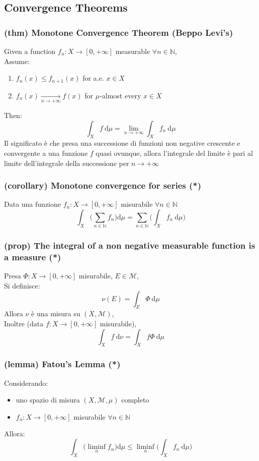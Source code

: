 \subsection{Convergence Theorems}
\subsubsection{(thm) Monotone Convergence Theorem (Beppo Levi's)}
Given a function $f_n:X\to [0,+\infty]$ measurable $\forall n\in \mathbb N$,\\
Assume:
\begin{enumerate}[label=\roman*.]
    \item $f_n(x)\le f_{n+1}(x)$ for a.e. $x\in X$
    \item $f_n(x)\xrightarrow[n\to+\infty]{} f(x)$ for $\mu$-almost every $x\in X$
\end{enumerate}
Then:
$$\int_X f\ \mathrm d\mu=\lim_{n\to +\infty}\int_X f_n\ \mathrm d\mu$$
Il significato è che presa una successione di funzioni non negative crescente e convergente a una funzione $f$ quasi ovunque, allora l'integrale del limite è pari al limite dell'integrale della successione per $n \to +\infty$

\subsubsection{(corollary) Monotone convergence for series (*)}
Data una funzione $f_n:X\to [0,+\infty]$ misurabile $\forall n\in \mathbb N$
$$\int_X\Big(\sum_{n\in \mathbb N}f_n\Big)\mathrm d\mu=\sum_{n\in\mathbb N}\Big(\int_X f_n \ \mathrm d\mu\Big )$$
\subsubsection{(prop) The integral of a non negative measurable function is a measure (*)}
Presa $\Phi : X\to [0,+\infty]$ misurabile, $E\in \mathcal M$,\\
Si definisce:
$$\nu(E)=\int_E \Phi\ \mathrm d\mu$$
Allora $\nu$ è una misura su $(X,\mathcal M)$,\\
Inoltre (data $f:X\to[0,+\infty]$ misurabile),
$$\int_X f\ \mathrm d\nu = \int_X f\Phi \ \mathrm d\mu$$
\subsubsection{(lemma) Fatou's Lemma (*)}
Considerando:
\begin{itemize}
    \item uno spazio di misura $(X,\mathcal M,\mu)$ completo
    \item $f_n:X\to [0,+\infty]$ misurabile $\forall n\in \mathbb N$
\end{itemize}
Allora:
$$\int_X\Big ( \liminf_n f_n\Big ) \mathrm d\mu\le \liminf_n\Big(\int_X f_n\ \mathrm d\mu\Big)$$
